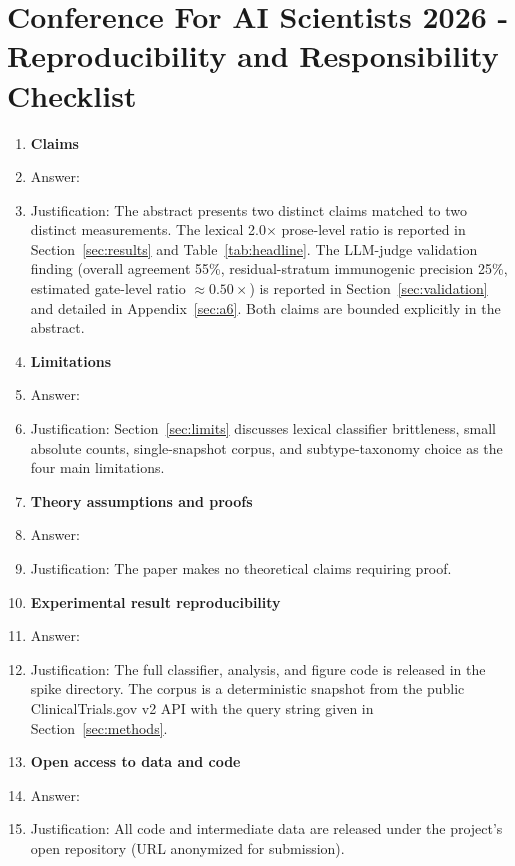 \documentclass{article}
\begin{document}
\newpage

\section*{Conference For AI Scientists 2026 - Reproducibility and Responsibility Checklist}
\label{checklist_reproducibility}

\begin{enumerate}

\item {\bf Claims}
    \item[] Answer: \answerYes{}
    \item[] Justification: The abstract presents two distinct claims
    matched to two distinct measurements.  The lexical 2.0$\times$
    prose-level ratio is reported in Section~\ref{sec:results} and
    Table~\ref{tab:headline}.  The LLM-judge validation finding
    (overall agreement 55\%, residual-stratum immunogenic precision
    25\%, estimated gate-level ratio $\approx 0.50\times$) is
    reported in Section~\ref{sec:validation} and detailed in
    Appendix~\ref{sec:a6}.  Both claims are bounded explicitly in
    the abstract.

\item {\bf Limitations}
    \item[] Answer: \answerYes{}
    \item[] Justification: Section~\ref{sec:limits} discusses lexical
    classifier brittleness, small absolute counts, single-snapshot
    corpus, and subtype-taxonomy choice as the four main limitations.

\item {\bf Theory assumptions and proofs}
    \item[] Answer: \answerNA{}
    \item[] Justification: The paper makes no theoretical claims
    requiring proof.

\item {\bf Experimental result reproducibility}
    \item[] Answer: \answerYes{}
    \item[] Justification: The full classifier, analysis, and figure
    code is released in the spike directory.  The corpus is a
    deterministic snapshot from the public ClinicalTrials.gov v2 API
    with the query string given in Section~\ref{sec:methods}.

\item {\bf Open access to data and code}
    \item[] Answer: \answerYes{}
    \item[] Justification: All code and intermediate data are released
    under the project's open repository (URL anonymized for
    submission).


\end{enumerate}
\end{document}
